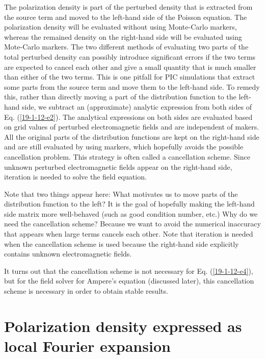 \documentclass{article}
\begin{document}
The polarization density is part of the perturbed density that is extracted
from the source term and moved to the left-hand side of the Poisson equation.
The polarization density will be evaluated without using Monte-Carlo markers,
whereas the remained density on the right-hand side will be evaluated using
Mote-Carlo markers. The two different methods of evaluating two parts of the
total perturbed density can possibly introduce significant errors if the two
terms are expected to cancel each other and give a small quantity that is much
smaller than either of the two terms. This is one pitfall for PIC simulations
that extract some parts from the source term and move them to the left-hand
side. To remedy this, rather than directly moving a part of the distribution
function to the left-hand side, we subtract an (approximate) analytic
expression from both sides of Eq. (\ref{19-1-12-e2}). The analytical
expressions on both sides are evaluated based on grid values of perturbed
electromagnetic fields and are independent of makers. All the original parts
of the distribution functions are kept on the right-hand side and are still
evaluated by using markers, which hopefully avoids the possible cancellation
problem. This strategy is often called a cancellation scheme. Since unknown
perturbed electromagnetic fields appear on the right-hand side, iteration is
needed to solve the field equation.

Note that two things appear here: What motivates us to move parts of the
distribution function to the left? It is the goal of hopefully making the
left-hand side matrix more well-behaved (such as good condition number, etc.)
Why do we need the cancellation scheme? Because we want to avoid the numerical
inaccuracy that appears when large terms cancels each other. Note that
iteration is needed when the cancellation scheme is used because the
right-hand side explicitly contains unknown electromagnetic fields.

It turns out that the cancellation scheme is not necessary for Eq.
(\ref{19-1-12-e4}), but for the field solver for Ampere's equation (discussed
later), this cancellation scheme is necessary in order to obtain stable
results.

\section{Polarization density expressed as local Fourier
expansion}\label{21-8-22-a3}
\end{document}
